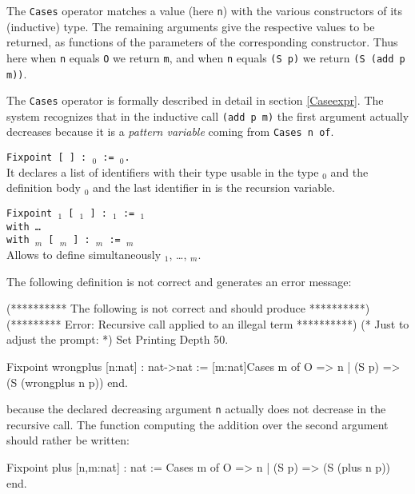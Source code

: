 The {\tt Cases} operator matches a value (here \verb:n:) with the
various constructors of its (inductive) type. The remaining arguments
give the respective values to be returned, as functions of the
parameters of the corresponding constructor. Thus here when \verb:n:
equals \verb:O: we return \verb:m:, and when \verb:n: equals 
\verb:(S p): we return \verb:(S (add p m)):.

The {\tt Cases} operator is formally described
in detail in section \ref{Caseexpr}.  The system recognizes that in
the inductive call {\tt (add p m)} the first argument actually
decreases because it is a {\em pattern variable} coming from {\tt Cases
  n of}.

\begin{Variants}
\item {\tt Fixpoint {\ident} [ {\params} ] : \type$_0$ :=
\term$_0$.}\\
        It declares a list of identifiers with their type
        usable in the type \type$_0$ and the definition body \term$_0$
        and the last identifier in {\params} is the recursion variable.
\item {\tt Fixpoint {\ident$_1$} [ {\params$_1$} ] :
        {\type$_1$} := {\term$_1$}\\
        with {\ldots} \\
        with {\ident$_m$}  [ {\params$_m$} ] : {\type$_m$} := 
        {\type$_m$}}\\
        Allows to define simultaneously {\ident$_1$}, {\ldots},
        {\ident$_m$}.
\end{Variants}

\Example The following definition is not correct and generates an
error message:

\begin{coq_eval}
(********** The following is not correct and should produce **********)
(********* Error: Recursive call applied to an illegal term **********)
(* Just to adjust the prompt: *) Set Printing Depth 50.
\end{coq_eval}
\begin{coq_example}
Fixpoint wrongplus [n:nat] : nat->nat 
   := [m:nat]Cases m of O => n | (S p) => (S (wrongplus n p)) end.
\end{coq_example}

because the declared decreasing argument {\tt n} actually does not
decrease in the recursive call.  The function computing the addition
over the second argument should rather be written:

\begin{coq_example*}
Fixpoint plus [n,m:nat] : nat 
   := Cases m of O => n | (S p) => (S (plus n p)) end.
\end{coq_example*}

